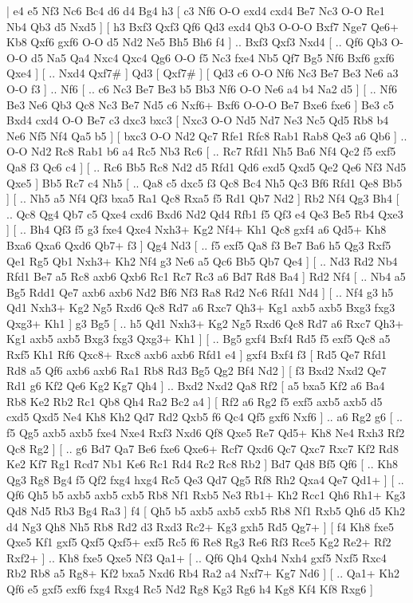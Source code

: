 \makegametitle 
|   e4   e5    Nf3   Nc6    Bc4   d6    d4   Bg4    h3 [  c3 Nf6  O-O exd4  cxd4 Be7  Nc3 O-O  Re1 Nb4  Qb3 d5  Nxd5   ]  [  h3 Bxf3  Qxf3 Qf6  Qd3 exd4  Qb3 O-O-O  Bxf7 Nge7  Qe6+ Kb8  Qxf6 gxf6  O-O d5  Nd2 Ne5  Bh5 Bh6  f4   ] .. Bxf3    Qxf3   Nxd4    [ .. Qf6  Qb3 O-O-O  d5 Na5  Qa4 Nxc4  Qxc4 Qg6  O-O f5  Nc3 fxe4  Nb5 Qf7  Bg5 Nf6  Bxf6 gxf6  Qxe4   ]  [ .. Nxd4  Qxf7#   ]  Qd3 [  Qxf7#   ]  [  Qd3 c6  O-O Nf6  Nc3 Be7  Be3 Ne6  a3 O-O  f3   ] .. Nf6    [ .. c6  Nc3 Be7  Be3 b5  Bb3 Nf6  O-O Ne6  a4 b4  Na2 d5   ]  [ .. Nf6  Be3 Ne6  Qb3 Qc8  Nc3 Be7  Nd5 c6  Nxf6+ Bxf6  O-O-O Be7  Bxe6 fxe6   ]  Be3   c5    Bxd4   cxd4    O-O   Be7    c3   dxc3    bxc3 [  Nxc3 O-O  Nd5 Nd7  Ne3 Nc5  Qd5 Rb8  b4 Ne6  Nf5 Nf4  Qa5 b5   ]  [  bxc3 O-O  Nd2 Qc7  Rfe1 Rfc8  Rab1 Rab8  Qe3 a6  Qb6   ] .. O-O    Nd2   Rc8    Rab1   b6    a4   Rc5    Nb3   Rc6 [ .. Rc7  Rfd1 Nh5  Ba6 Nf4  Qc2 f5  exf5 Qa8  f3 Qc6  c4   ]  [ .. Rc6  Bb5 Rc8  Nd2 d5  Rfd1 Qd6  exd5 Qxd5  Qe2 Qe6  Nf3 Nd5  Qxe5   ]  Bb5   Rc7    c4   Nh5 [ .. Qa8  c5 dxc5  f3 Qc8  Bc4 Nh5  Qc3 Bf6  Rfd1 Qe8  Bb5   ]  [ .. Nh5  a5 Nf4  Qf3 bxa5  Ra1 Qc8  Rxa5 f5  Rd1 Qb7  Nd2   ]  Rb2   Nf4    Qg3   Bh4 [ .. Qc8  Qg4 Qb7  c5 Qxe4  cxd6 Bxd6  Nd2 Qd4  Rfb1 f5  Qf3 e4  Qe3 Be5  Rb4 Qxe3   ]  [ .. Bh4  Qf3 f5  g3 fxe4  Qxe4 Nxh3+  Kg2 Nf4+  Kh1 Qc8  gxf4 a6  Qd5+ Kh8  Bxa6 Qxa6  Qxd6 Qb7+  f3   ]  Qg4   Nd3 [ .. f5  exf5 Qa8  f3 Be7  Ba6 h5  Qg3 Rxf5  Qe1 Rg5  Qb1 Nxh3+  Kh2 Nf4  g3 Ne6  a5 Qc6  Bb5 Qb7  Qe4   ]  [ .. Nd3  Rd2 Nb4  Rfd1 Be7  a5 Rc8  axb6 Qxb6  Rc1 Rc7  Rc3 a6  Bd7 Rd8  Ba4   ]  Rd2   Nf4 [ .. Nb4  a5 Bg5  Rdd1 Qe7  axb6 axb6  Nd2 Bf6  Nf3 Ra8  Rd2 Nc6  Rfd1 Nd4   ]  [ .. Nf4  g3 h5  Qd1 Nxh3+  Kg2 Ng5  Rxd6 Qc8  Rd7 a6  Rxc7 Qh3+  Kg1 axb5  axb5 Bxg3  fxg3 Qxg3+  Kh1   ]  g3   Bg5 [ .. h5  Qd1 Nxh3+  Kg2 Ng5  Rxd6 Qc8  Rd7 a6  Rxc7 Qh3+  Kg1 axb5  axb5 Bxg3  fxg3 Qxg3+  Kh1   ]  [ .. Bg5  gxf4 Bxf4  Rd5 f5  exf5 Qc8  a5 Rxf5  Kh1 Rf6  Qxc8+ Rxc8  axb6 axb6  Rfd1 e4   ]  gxf4   Bxf4    f3 [  Rd5 Qe7  Rfd1 Rd8  a5 Qf6  axb6 axb6  Ra1 Rb8  Rd3 Bg5  Qg2 Bf4  Nd2   ]  [  f3 Bxd2  Nxd2 Qe7  Rd1 g6  Kf2 Qe6  Kg2 Kg7  Qh4   ] .. Bxd2    Nxd2   Qa8    Rf2 [  a5 bxa5  Kf2 a6  Ba4 Rb8  Ke2 Rb2  Rc1 Qb8  Qh4 Ra2  Bc2 a4   ]  [  Rf2 a6  Rg2 f5  exf5 axb5  axb5 d5  cxd5 Qxd5  Ne4 Kh8  Kh2 Qd7  Rd2 Qxb5  f6 Qc4  Qf5 gxf6  Nxf6   ] .. a6    Rg2   g6 [ .. f5  Qg5 axb5  axb5 fxe4  Nxe4 Rxf3  Nxd6 Qf8  Qxe5 Re7  Qd5+ Kh8  Ne4 Rxh3  Rf2 Qc8  Rg2   ]  [ .. g6  Bd7 Qa7  Be6 fxe6  Qxe6+ Rcf7  Qxd6 Qc7  Qxc7 Rxc7  Kf2 Rd8  Ke2 Kf7  Rg1 Rcd7  Nb1 Ke6  Rc1 Rd4  Rc2 Rc8  Rb2   ]  Bd7   Qd8    Bf5   Qf6 [ .. Kh8  Qg3 Rg8  Bg4 f5  Qf2 fxg4  hxg4 Rc5  Qe3 Qd7  Qg5 Rf8  Rh2 Qxa4  Qe7 Qd1+   ]  [ .. Qf6  Qh5 b5  axb5 axb5  cxb5 Rb8  Nf1 Rxb5  Ne3 Rb1+  Kh2 Rcc1  Qh6 Rh1+  Kg3 Qd8  Nd5 Rb3  Bg4 Ra3   ]  f4 [  Qh5 b5  axb5 axb5  cxb5 Rb8  Nf1 Rxb5  Qh6 d5  Kh2 d4  Ng3 Qh8  Nh5 Rb8  Rd2 d3  Rxd3 Rc2+  Kg3 gxh5  Rd5 Qg7+   ]  [  f4 Kh8  fxe5 Qxe5  Kf1 gxf5  Qxf5 Qxf5+  exf5 Rc5  f6 Re8  Rg3 Re6  Rf3 Rce5  Kg2 Re2+  Rf2 Rxf2+   ] .. Kh8    fxe5   Qxe5    Nf3   Qa1+ [ .. Qf6  Qh4 Qxh4  Nxh4 gxf5  Nxf5 Rxc4  Rb2 Rb8  a5 Rg8+  Kf2 bxa5  Nxd6 Rb4  Ra2 a4  Nxf7+ Kg7  Nd6   ]  [ .. Qa1+  Kh2 Qf6  e5 gxf5  exf6 fxg4  Rxg4 Rc5  Nd2 Rg8  Kg3 Rg6  h4 Kg8  Kf4 Kf8  Rxg6   ]  